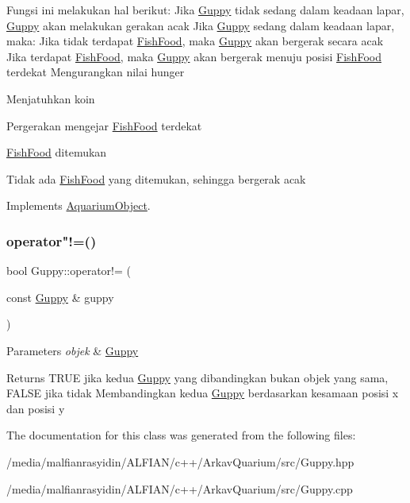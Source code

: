 Fungsi ini melakukan hal berikut\+: Jika \mbox{\hyperlink{class_guppy}{Guppy}} tidak sedang dalam keadaan lapar, \mbox{\hyperlink{class_guppy}{Guppy}} akan melakukan gerakan acak Jika \mbox{\hyperlink{class_guppy}{Guppy}} sedang dalam keadaan lapar, maka\+: Jika tidak terdapat \mbox{\hyperlink{class_fish_food}{Fish\+Food}}, maka \mbox{\hyperlink{class_guppy}{Guppy}} akan bergerak secara acak Jika terdapat \mbox{\hyperlink{class_fish_food}{Fish\+Food}}, maka \mbox{\hyperlink{class_guppy}{Guppy}} akan bergerak menuju posisi \mbox{\hyperlink{class_fish_food}{Fish\+Food}} terdekat Mengurangkan nilai hunger

Menjatuhkan koin

Pergerakan mengejar \mbox{\hyperlink{class_fish_food}{Fish\+Food}} terdekat

\mbox{\hyperlink{class_fish_food}{Fish\+Food}} ditemukan

Tidak ada \mbox{\hyperlink{class_fish_food}{Fish\+Food}} yang ditemukan, sehingga bergerak acak 

Implements \mbox{\hyperlink{class_aquarium_object_a42c4de640f89ac8aebc26b7618578575}{Aquarium\+Object}}.

\mbox{\label{class_guppy_af967c03410302b43a594b3bdf8892e87}} 
\subsubsection{\texorpdfstring{operator"!=()}{operator!=()}}
{\footnotesize\ttfamily bool Guppy\+::operator!= (\begin{DoxyParamCaption}\item[{const \mbox{\hyperlink{class_guppy}{Guppy}} \&}]{guppy }\end{DoxyParamCaption})}


\begin{DoxyParams}{Parameters}
{\em objek} & \mbox{\hyperlink{class_guppy}{Guppy}} \\
\hline
\end{DoxyParams}
\begin{DoxyReturn}{Returns}
T\+R\+UE jika kedua \mbox{\hyperlink{class_guppy}{Guppy}} yang dibandingkan bukan objek yang sama, F\+A\+L\+SE jika tidak Membandingkan kedua \mbox{\hyperlink{class_guppy}{Guppy}} berdasarkan kesamaan posisi x dan posisi y 
\end{DoxyReturn}


The documentation for this class was generated from the following files\+:\begin{DoxyCompactItemize}
\item 
/media/malfianrasyidin/\+A\+L\+F\+I\+A\+N/c++/\+Arkav\+Quarium/src/Guppy.\+hpp\item 
/media/malfianrasyidin/\+A\+L\+F\+I\+A\+N/c++/\+Arkav\+Quarium/src/Guppy.\+cpp\end{DoxyCompactItemize}
